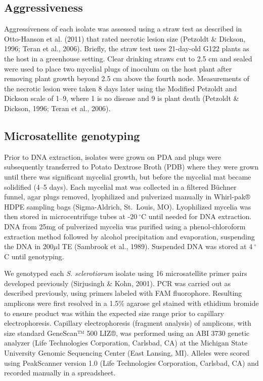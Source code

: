 \documentclass[fleqn,10pt,lineno]{wlpeerj} %
\theoremstyle{definition}
\theoremstyle{definition}
\theoremstyle{definition}
\theoremstyle{remark}
\begin{document}
\subsection*{Aggressiveness}\label{aggressiveness}

Aggressiveness of each isolate was assessed using a straw test as
described in Otto-Hanson et al. (2011) that rated necrotic lesion size
(Petzoldt \& Dickson, 1996; Teran et al., 2006). Briefly, the straw test
uses 21-day-old G122 plants as the host in a greenhouse setting. Clear
drinking straws cut to 2.5 cm and sealed were used to place two mycelial
plugs of inoculum on the host plant after removing plant growth beyond
2.5 cm above the fourth node. Measurements of the necrotic lesion were
taken 8 days later using the Modified Petzoldt and Dickson scale of
1--9, where 1 is no disease and 9 is plant death (Petzoldt \& Dickson,
1996; Teran et al., 2006).

\subsection*{Microsatellite genotyping}\label{microsatellite-genotyping}

Prior to DNA extraction, isolates were grown on PDA and plugs were
subsequently transferred to Potato Dextrose Broth (PDB) where they were
grown until there was significant mycelial growth, but before the
mycelial mat became solidified (4--5 days). Each mycelial mat was
collected in a filtered Büchner funnel, agar plugs removed, lyophilized
and pulverized manually in Whirl-pak® HDPE sampling bags (Sigma-Aldrich,
St.~Louis, MO). Lyophilized mycelia was then stored in microcentrifuge
tubes at -\(20~^{\circ}\)C until needed for DNA extraction. DNA from
25mg of pulverized mycelia was purified using a phenol-chloroform
extraction method followed by alcohol precipitation and evaporation,
suspending the DNA in 200\(\mu\)l TE (Sambrook et al., 1989). Suspended
DNA was stored at \(4~^{\circ}\)C until genotyping.

We genotyped each \emph{S. sclerotiorum} isolate using 16 microsatellite
primer pairs developed previously (Sirjusingh \& Kohn, 2001). PCR was
carried out as described previously, using primers labeled with FAM
fluorophore. Resulting amplicons were first resolved in a 1.5\% agarose
gel stained with ethidium bromide to ensure product was within the
expected size range prior to capillary electrophoresis. Capillary
electrophoresis (fragment analysis) of amplicons, with size standard
GeneScan™ 500 LIZ®, was performed using an ABI 3730 genetic analyzer
(Life Technologies Corporation, Carlsbad, CA) at the Michigan State
University Genomic Sequencing Center (East Lansing, MI). Alleles were
scored using PeakScanner version 1.0 (Life Technologies Corporation,
Carlsbad, CA) and recorded manually in a spreadsheet.
\end{document}
